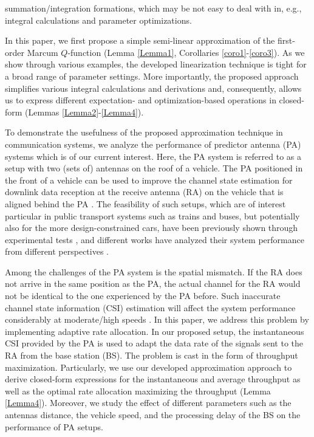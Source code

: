 summation/integration formations, which may be not easy to deal with in, e.g., integral calculations and parameter optimizations. 


In this paper, we first propose a simple semi-linear approximation of the first-order Marcum $Q$-function (Lemma \ref{Lemma1}, Corollaries \ref{coro1}-\ref{coro3}). As we show through various examples, the developed linearization technique is tight for a broad range of parameter settings. More importantly, the proposed approach simplifies various integral calculations and derivations and, consequently, allows us to express different expectation- and optimization-based operations in closed-form (Lemmas \ref{Lemma2}-\ref{Lemma4}). 

To demonstrate the usefulness of the proposed approximation technique in communication systems, we analyze the performance of predictor antenna (PA) systems which is of our current interest. Here, the PA system is referred to as a setup with two (sets of) antennas on the roof of a vehicle. The PA positioned in the front of a vehicle can be used to improve the channel state estimation for downlink data reception at the receive antenna (RA) on the vehicle that is aligned behind the PA \cite{Sternad2012WCNCWusing,DT2015ITSMmaking,BJ2017PIMRCpredictor,phan2018WSAadaptive,Jamaly2014EuCAPanalysis, BJ2017ICCWusing,Apelfrojd2018PIMRCkalman,Jamaly2019IETeffects,Guo2019WCLrate}. The feasibility of such setups,   which are of interest particular in public transport systems such as trains and buses, but potentially also for the more design-constrained cars, have been previously shown through experimental tests \cite{Sternad2012WCNCWusing,DT2015ITSMmaking,BJ2017PIMRCpredictor,phan2018WSAadaptive}, and different works have analyzed their system performance from different perspectives \cite{Jamaly2014EuCAPanalysis, BJ2017ICCWusing,Apelfrojd2018PIMRCkalman,Jamaly2019IETeffects,Guo2019WCLrate}. 

Among the challenges of the PA system is the spatial mismatch. If the RA does not arrive in the same position as the PA, the actual channel for the RA would not be identical to the one experienced by the PA before. Such inaccurate channel state information (CSI) estimation will affect the system performance considerably at moderate/high speeds \cite{DT2015ITSMmaking,Guo2019WCLrate}. In this paper, we address this problem by implementing adaptive rate allocation. In our proposed setup, the instantaneous CSI provided by the PA is used to adapt the data rate of the signals sent to the RA from the base station (BS). The problem is cast in the form of throughput maximization. Particularly, we use our developed approximation approach to derive closed-form expressions for the instantaneous and average throughput as well as the optimal rate allocation maximizing the throughput (Lemma \ref{Lemma4}). Moreover, we study the effect of different parameters such as the antennas distance, the vehicle speed, and the processing delay of the BS on the performance of PA setups. 


